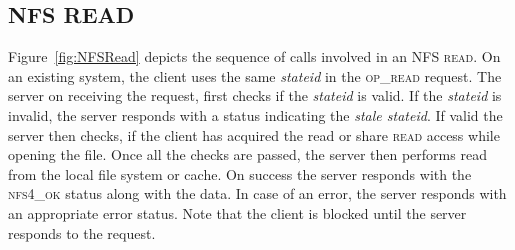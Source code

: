 \subsection{NFS READ}
Figure~\ref{fig:NFSRead} depicts the sequence of calls involved in an \textsc{NFS read}. On an existing system, the client uses the same \textit{stateid} in the \textsc{op\_read} request. The server on receiving the request, first checks if the \textit{stateid} is valid. If the \textit{stateid} is invalid, the server responds with a status indicating the \textit{stale stateid}. If valid the server then checks, if the client has acquired the read or share \textsc{read} access while opening the file. Once all the checks are passed, the server then performs read from the local file system or cache. On success the server responds with the \textsc{nfs4\_ok} status along with the data. In case of an error, the server responds with an appropriate error status. Note that the client is blocked until the server responds to the request.

